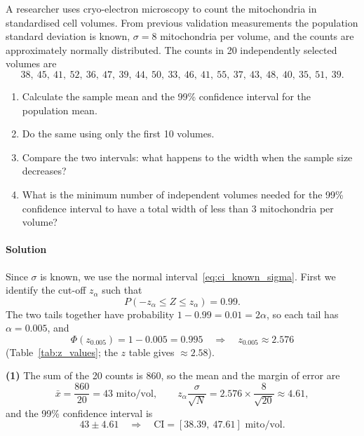 A researcher uses cryo-electron microscopy to count the mitochondria in standardised cell volumes. From previous validation measurements the population standard deviation is known, $\sigma = 8$ mitochondria per volume, and the counts are approximately normally distributed. The counts in 20 independently selected volumes are
\begin{equation*}
38,\ 45,\ 41,\ 52,\ 36,\ 47,\ 39,\ 44,\ 50,\ 33,\ 46,\ 41,\ 55,\ 37,\ 43,\ 48,\ 40,\ 35,\ 51,\ 39.
\end{equation*}
\begin{enumerate}[label=(\arabic*)]
    \item Calculate the sample mean and the 99\% confidence interval for the population mean.
    \item Do the same using only the first 10 volumes.
    \item Compare the two intervals: what happens to the width when the sample size decreases?
    \item What is the minimum number of independent volumes needed for the 99\% confidence interval to have a total width of less than 3 mitochondria per volume?
\end{enumerate}

\paragraph{Solution} Since $\sigma$ is known, we use the normal interval~\eqref{eq:ci_known_sigma}. First we identify the cut-off $z_\alpha$ such that
\begin{equation*}
P(-z_\alpha \le Z \le z_\alpha) = 0.99.
\end{equation*}
The two tails together have probability $1 - 0.99 = 0.01 = 2\alpha$, so each tail has $\alpha = 0.005$, and
\begin{equation*}
\Phi(z_{0.005}) = 1 - 0.005 = 0.995 \quad \Longrightarrow \quad z_{0.005} \approx 2.576
\end{equation*}
(Table~\ref{tab:z_values}; the $z$ table gives $\approx 2.58$).

\textbf{(1)} The sum of the 20 counts is 860, so the mean and the margin of error are
\begin{equation*}
\bar{x} = \frac{860}{20} = 43\text{ mito/vol}, \qquad z_\alpha\frac{\sigma}{\sqrt{N}} = 2.576 \times \frac{8}{\sqrt{20}} \approx 4.61,
\end{equation*}
and the 99\% confidence interval is
\begin{equation*}
43 \pm 4.61 \quad \Longrightarrow \quad \text{CI} = [38.39,\ 47.61]\text{ mito/vol}.
\end{equation*}

